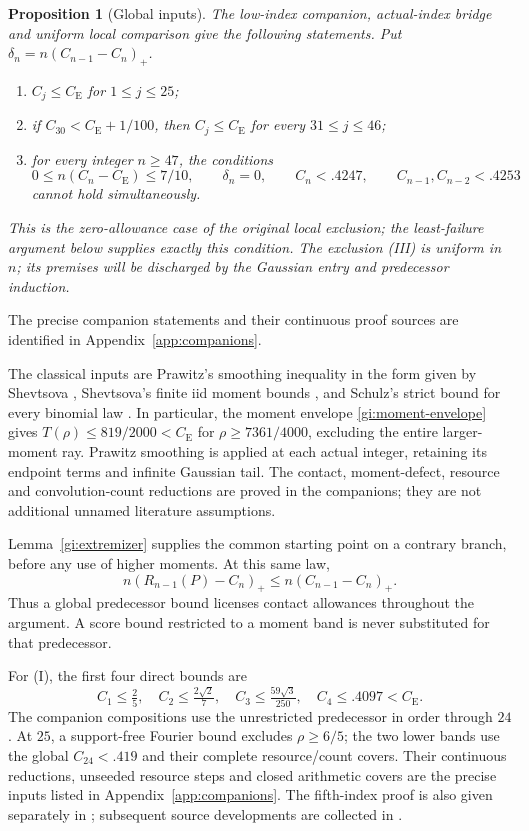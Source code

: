 \documentclass[aop,preprint]{imsart}
\newtheorem{proposition}[theorem]{Proposition}
\theoremstyle{definition}
\newcommand{\CE}{C_{\mathrm E}}
\newcommand{\pos}[1]{(#1)_+}
\numberwithin{equation}{section}
\begin{document}
\begin{proposition}[Global inputs]\label{gi:inputs}
The low-index companion, actual-index bridge and uniform local comparison
give the following statements. Put
$\delta_n=n\pos{C_{n-1}-C_n}$.
\begin{enumerate}
\item[(I)] $C_j\le\CE$ for $1\le j\le25$;
\item[(II)] if $C_{30}<\CE+1/100$, then $C_j\le\CE$ for
every $31\le j\le46$;
\item[(III)] for every integer $n\ge47$, the conditions
\[
 0\le n(C_n-\CE)\le7/10,\qquad \delta_n=0,
 \qquad C_n<.4247,\qquad C_{n-1},C_{n-2}<.4253
\]
cannot hold simultaneously.
\end{enumerate}
This is the zero-allowance case of the original local exclusion;
the least-failure argument below supplies exactly this condition.
The exclusion (III) is uniform in $n$; its premises will be
discharged by the Gaussian entry and predecessor induction.
\end{proposition}
The precise companion statements and their continuous proof sources
are identified in Appendix~\ref{app:companions}.


The classical inputs are Prawitz's smoothing inequality \cite{Prawitz1972} in the form
given by Shevtsova \cite[Lemma~4.1, p.~263]{Shevtsova2012},
Shevtsova's finite iid moment bounds \cite{Shevtsova2013}, and
Schulz's strict bound for every binomial law \cite[Theorem~1]{Schulz2016}.
In particular, the moment envelope \eqref{gi:moment-envelope} gives
$T(\rho)\le819/2000<\CE$ for $\rho\ge7361/4000$,
excluding the entire larger-moment ray.
Prawitz smoothing is applied at each actual integer, retaining its
endpoint terms and infinite Gaussian tail. The contact, moment-defect,
resource and convolution-count reductions are proved in the companions;
they are not additional unnamed literature assumptions.

Lemma~\ref{gi:extremizer} supplies the common starting point on a
contrary branch, before any use of higher moments. At this same law,
\begin{equation}\label{gi:predecessor}
 n\pos{R_{n-1}(P)-C_n}\le n\pos{C_{n-1}-C_n}.
\end{equation}
Thus a global predecessor bound licenses contact allowances throughout
the argument. A score bound restricted to a moment band is never
substituted for that predecessor.

For (I), the first four direct bounds are
\[
 C_1\le\tfrac25,\quad C_2\le\tfrac{2\sqrt2}{7},\quad
 C_3\le\tfrac{59\sqrt3}{250},\quad C_4\le.4097<\CE.
\]
The companion compositions use the unrestricted predecessor in order
through $24$. At $25$, a support-free Fourier bound excludes
$\rho\ge6/5$; the two lower bands use the global $C_{24}<.419$
and their complete resource/count covers. Their continuous reductions,
unseeded resource steps and closed arithmetic covers are the precise
inputs listed in Appendix~\ref{app:companions}. The fifth-index proof
is also given separately in \cite{RKFive2026}; subsequent source
developments are collected in \cite{RKSources2026}.
\end{document}
